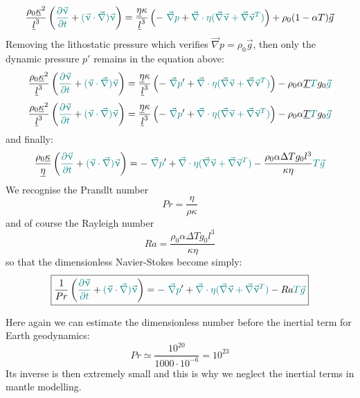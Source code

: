 \[
\frac{\rho_0 \underline{\kappa}^2}{\underline{l}^3}
\left( {\color{teal} \frac{\partial \vec\upnu}{\partial t}}
+{\color{teal} (\vec\upnu \cdot\vec\nabla) \vec\upnu} 
\right)
=
\frac{\underline{\eta}\kappa}{\underline{l}^3}
\left( - \ {\color{teal} \vec\nabla p}
+ {\color{teal} \vec\nabla \cdot \eta (\vec\nabla \vec \upnu + \vec\nabla \vec \upnu ^T)}
\right)
+ \rho_0(1 - \alpha T) \vec{g}
\]
Removing the lithostatic pressure which verifies $\vec\nabla p = \rho_0 \vec{g} $, then 
only the dynamic pressure $p'$ remains in the equation above:
\[
\frac{\rho_0 \underline{\kappa}^2}{\underline{l}^3}
\left( {\color{teal} \frac{\partial \vec\upnu}{\partial t}}
+{\color{teal} (\vec\upnu \cdot\vec\nabla) \vec\upnu} 
\right)
=
\frac{\underline{\eta}\kappa}{\underline{l}^3}
\left( - \ {\color{teal} \vec\nabla p}'
+ {\color{teal} \vec\nabla \cdot \eta (\vec\nabla \vec \upnu + \vec\nabla \vec \upnu ^T)}
\right)
- \rho_0 \alpha \underline{T} {\color{teal}T} g_0 {\color{teal}\vec{g}}
\]
\[
\frac{\rho_0 \underline{\kappa}^2}{\underline{l}^3}
\left( {\color{teal} \frac{\partial \vec\upnu}{\partial t}}
+{\color{teal} (\vec\upnu \cdot\vec\nabla) \vec\upnu} 
\right)
=
\frac{\underline{\eta}\kappa}{\underline{l}^3}
\left( - \ {\color{teal} \vec\nabla p}'
+ {\color{teal} \vec\nabla \cdot \eta (\vec\nabla \vec \upnu + \vec\nabla \vec \upnu ^T)}
\right)
- \rho_0 \alpha \underline{T} {\color{teal}T} g_0 {\color{teal}\vec{g}}
\]
and finally:
\[
\frac{\rho_0 \underline{\kappa}}{\underline{\eta}}
\left( {\color{teal} \frac{\partial \vec\upnu}{\partial t}}
+{\color{teal} (\vec\upnu \cdot\vec\nabla) \vec\upnu} 
\right)
=
- \ {\color{teal} \vec\nabla p}'
+ {\color{teal} \vec\nabla \cdot \eta (\vec\nabla \vec \upnu + \vec\nabla \vec \upnu ^T)}
- \frac{ \rho_0 \alpha \Delta T  g_0  l^3}{\kappa \eta} {\color{teal}T}  {\color{teal}\vec{g}}
\]
We recognise the Prandlt number 
\[
Pr=\frac{\eta}{\rho \kappa}
\]
and of course the Rayleigh number
\[
Ra= \frac{ \rho_0 \alpha \Delta T  g_0  l^3}{\kappa \eta}
\]
so that the dimensionless Navier-Stokes become simply:
\[
\boxed{
\frac{1}{Pr}
\left( {\color{teal} \frac{\partial \vec\upnu}{\partial t}}
+{\color{teal} (\vec\upnu \cdot\vec\nabla) \vec\upnu} 
\right)
=
 - \ {\color{teal} \vec\nabla p}'
+ {\color{teal} \vec\nabla \cdot \eta (\vec\nabla \vec \upnu + \vec\nabla \vec \upnu ^T)}
- Ra  {\color{teal}T}  {\color{teal}\vec{g}}
}
\]

Here again we can estimate the dimensionless number before the inertial term for Earth 
geodynamics:
\[
Pr \simeq \frac{10^{20}}{1000 \cdot 10^{-6}} = 10^{23}
\]
Its inverse is then extremely small and this is why we neglect the inertial terms
in mantle modelling.














